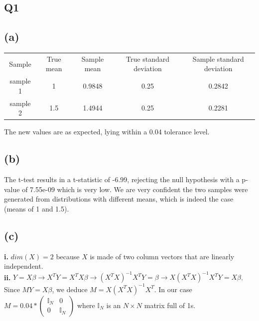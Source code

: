 \documentclass[12pt,a4paper,oneside]{report}
\begin{document}

\subsection*{Q1}
\subsection*{(a)}

\begin{center}
\begin{tabular}{c | c | c | c | c}
Sample & True mean & Sample mean & True standard deviation & Sample standard deviation\\
sample 1 & 1 & 0.9848 & 0.25 & 0.2842\\
sample 2 & 1.5 & 1.4944 & 0.25 & 0.2281\\
\end{tabular}
\end{center}

The new values are as expected, lying within a 0.04 tolerance level.

\subsection*{(b)}

The t-test results in a t-statistic of -6.99, rejecting the null hypothesis with a p-value of 7.55e-09 which is very low. We are very confident the two samples were generated from distributions with different means, which is indeed the case (means of 1 and 1.5).

\subsection*{(c)}

\textbf{i.} $dim(X) = 2$ because $X$ is made of two column vectors that are linearly independent.\\

\textbf{ii.} $Y = X\beta \to X^TY = X^TX\beta \to (X^TX)^{-1}X^TY = \beta \to X(X^TX)^{-1}X^TY = X\beta$. Since $MY = X\beta$, we deduce $M = X(X^TX)^{-1}X^T$. In our case $M = 
0.04 * \begin{pmatrix}
\mathbb{I}_N & 0\\
0 & \mathbb{I}_N
\end{pmatrix}
$
where $\mathbb{I}_N$ is an $N \times N$ matrix full of 1s.\\
                 
\end{document}
